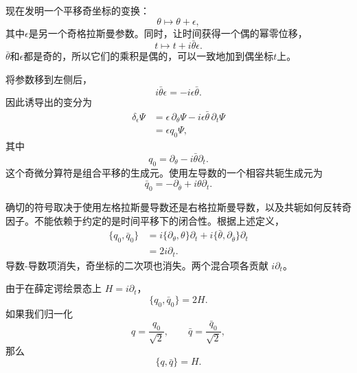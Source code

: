 现在发明一个平移奇坐标的变换：
\begin{equation}
\theta\longmapsto\theta+\epsilon,
\end{equation}
其中\(\epsilon\)是另一个奇格拉斯曼参数。同时，让时间获得一个偶的幂零位移，
\begin{equation}
t\longmapsto t+i\bar\theta\epsilon.
\end{equation}
\(\bar\theta\)和\(\epsilon\)都是奇的，所以它们的乘积是偶的，可以一致地加到偶坐标\(t\)上。

将参数移到左侧后，
\begin{equation}
i\bar\theta\epsilon=-i\epsilon\bar\theta.
\end{equation}
因此诱导出的变分为
\begin{align}
\delta_\epsilon\Psi
&=\epsilon\,\partial_\theta\Psi
-i\epsilon\bar\theta\,\partial_t\Psi\\
&=\epsilon q_0\Psi,
\end{align}
其中
\begin{equation}
q_0=\partial_\theta-i\bar\theta\partial_t.
\end{equation}
这个奇微分算符是组合平移的生成元。使用左导数的一个相容共轭生成元为
\begin{equation}
\bar q_0=-\partial_{\bar\theta}
+i\theta\partial_t.
\end{equation}

确切的符号取决于使用左格拉斯曼导数还是右格拉斯曼导数，以及共轭如何反转奇因子。不能依赖于约定的是时间平移下的闭合性。根据上述定义，
\begin{align}
\{q_0,\bar q_0\}
&=i\{\partial_\theta,\theta\}\partial_t
+i\{\bar\theta,\partial_{\bar\theta}\}\partial_t\\
&=2i\partial_t.
\end{align}
导数-导数项消失，奇坐标的二次项也消失。两个混合项各贡献 \(i\partial_t\)。

由于在薛定谔绘景态上 \(H=i\partial_t\)，
\begin{equation}
\{q_0,\bar q_0\}=2H.
\end{equation}
如果我们归一化
\begin{equation}
q=\frac{q_0}{\sqrt2},
\qquad
\bar q=\frac{\bar q_0}{\sqrt2},
\end{equation}
那么
\begin{equation}
\boxed{\{q,\bar q\}=H.}
\end{equation}


